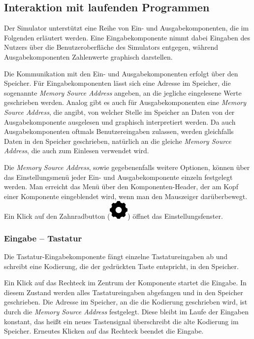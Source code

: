 \subsection{Interaktion mit laufenden Programmen}

Der Simulator unterstützt eine Reihe von Ein- und Ausgabekomponenten, die im
Folgenden erläutert werden. Eine Eingabekomponente nimmt dabei Eingaben des
Nutzers über die Benutzeroberfläche des Simulators entgegen, während
Ausgabekomponenten Zahlenwerte graphisch darstellen.

Die Kommunikation mit den Ein- und Ausgabekomponenten erfolgt über den Speicher.
Für Eingabekomponenten lässt sich eine Adresse im Speicher, die sogenannte
\textit{Memory Source Address} angeben, an die jegliche eingelesene Werte
geschrieben werden. Analog gibt es auch für Ausgabekomponenten eine
\textit{Memory Source Address}, die angibt, von welcher Stelle im Speicher an
Daten von der Ausgabekomponente ausgelesen und graphisch interpretiert werden.
Da auch Ausgabekomponenten oftmals Benutzereingaben zulassen, werden gleichfalls
Daten in den Speicher geschrieben, natürlich an die gleiche \textit{Memory Source
Address}, die auch zum Einlesen verwendet wird.

Die \textit{Memory Source Address}, sowie gegebenenfalls weitere Optionen, können
über das Einstellungsmenü jeder Ein- und Ausgabekomponente einzeln festgelegt
werden. Man erreicht das Menü über den Komponenten-Header, der am Kopf einer
Komponente eingeblendet wird, wenn man den Mauszeiger darüberbewegt. Ein Klick
auf den Zahnradbutton (\includegraphics[scale=0.22]{Images/SettingsIcon}) öffnet
das Einstellungsfenster.

\subsubsection{Eingabe -- Tastatur}

Die Tastatur-Eingabekomponente fängt einzelne Tastatureingaben ab und schreibt
eine Kodierung, die der gedrückten Taste entspricht, in den Speicher.

Ein Klick auf das Rechteck im Zentrum der Komponente startet die Eingabe. In
diesem Zustand werden alles Tastatureingaben abgefangen und in den Speicher
geschrieben. Die Adresse im Speicher, an die die Kodierung geschrieben wird, ist
durch die \textit{Memory Source Address} festgelegt. Diese bleibt im Laufe der
Eingaben konstant, das heißt ein neues Tastensignal überschreibt die alte
Kodierung im Speicher. Erneutes Klicken auf das Rechteck beendet die Eingabe.

